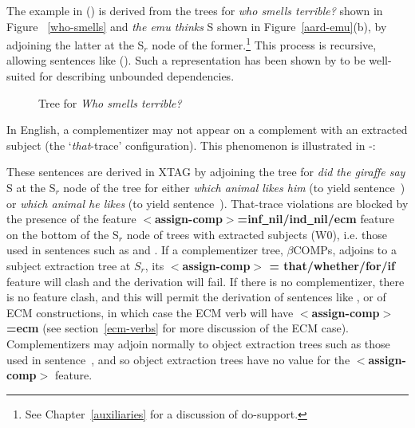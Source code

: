 The example in () is derived from the trees for {\it who smells
terrible?}  shown in Figure ~\ref{who-smells} and {\it the emu thinks} S shown
in Figure~\ref{aard-emu}(b), by adjoining the latter at the S$_r$ node of the
former.\footnote{See Chapter~\ref{auxiliaries} for a discussion of do-support.}
This process is recursive, allowing sentences like (). Such a
representation has been shown by \cite{kj85} to be well-suited for describing
unbounded dependencies.

\begin{figure}[thb]
\centering
\hspace{0.0in}
\caption{Tree for {\it Who smells terrible?}}
\label{who-smells}
\label{1;4,14}
\end{figure}

In English, a complementizer may not appear on a complement with an extracted
subject (the `{\it that}-trace' configuration). This phenomenon
is illustrated in -:


These sentences are derived in XTAG by adjoining the tree for {\it did the
giraffe say} S at the S$_r$ node of the tree for either {\it which animal likes
him} (to yield sentence~) or {\it which animal he likes} (to yield
sentence~).  That-trace violations are blocked by the presence of the
feature {\bf $<$assign-comp$>$=inf\underline{~}nil/ind\underline{~}nil/ecm}
feature on the bottom of the S$_r$ node of trees with extracted subjects (W0),
i.e. those used in sentences such as  and .  
If a complementizer tree, $\beta$COMPs, adjoins to a subject
extraction tree at $S_r$, its {\bf $<$assign-comp$>$ =
that/whether/for/if} feature will clash and the derivation will
fail. If there is no complementizer, there is no feature clash, and this will
permit the derivation of sentences like , or of ECM constructions, in
which case the ECM verb will have {\bf $<$assign-comp$>$=ecm} (see
section~\ref{ecm-verbs} for more discussion of the ECM case).
Complementizers may adjoin normally to object extraction trees such as those
used in sentence~, and so object extraction trees have no value 
for the {\bf $<$assign-comp$>$} feature.


